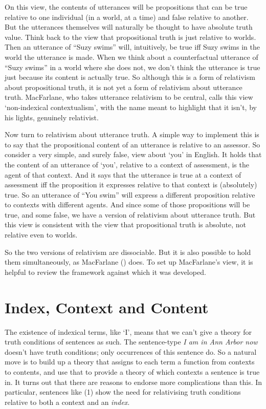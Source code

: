 \documentclass[
  11pt,
  letterpaper,
  DIV=11,
  numbers=noendperiod,
  twoside]{scrartcl}
\begin{document}
On this view, the contents of utterances will be propositions that can
be true relative to one individual (in a world, at a time) and false
relative to another. But the utterances themselves will naturally be
thought to have absolute truth value. Think back to the view that
propositional truth is just relative to worlds. Then an utterance of
``Suzy swims'' will, intuitively, be true iff Suzy swims in the world
the utterance is made. When we think about a counterfactual utterance of
``Suzy swims'' in a world where she does not, we don't think the
utterance is true just because its content is actually true. So although
this is a form of relativism about propositional truth, it is not yet a
form of relativism about utterance truth. MacFarlane, who takes
utterance relativism to be central, calls this view `non-indexical
contextualism', with the name meant to highlight that it isn't, by his
lights, genuinely relativist.

Now turn to relativism about utterance truth. A simple way to implement
this is to say that the propositional content of an utterance is
relative to an assessor. So consider a very simple, and surely false,
view about `you' in English. It holds that the content of an utterance
of `you', relative to a context of assessment, is the agent of that
context. And it says that the utterance is true at a context of
assessment iff the proposition it expresses relative to that context is
(absolutely) true. So an utterance of ``You swim'' will express a
different proposition relative to contexts with different agents. And
since some of those propositions will be true, and some false, we have a
version of relativism about utterance truth. But this view is consistent
with the view that propositional truth is absolute, not relative even to
worlds.

So the two versions of relativism are dissociable. But it is also
possible to hold them simultaneously, as MacFarlane
() does. To set up MacFarlane's view,
it is helpful to review the framework against which it was developed.

\section{Index, Context and Content}\label{indexcontextandcontent}

The existence of indexical terms, like `I', means that we can't give a
theory for truth conditions of sentences as such. The sentence-type
\emph{I am in Ann Arbor now} doesn't have truth conditions; only
occurrences of this sentence do. So a natural move is to build up a
theory that assigns to each term a function from contexts to contents,
and use that to provide a theory of which contexts a sentence is true
in. It turns out that there are reasons to endorse more complications
than this. In particular, sentences like (1) show the need for
relativising truth conditions relative to both a context and an
\emph{index}.
\end{document}
